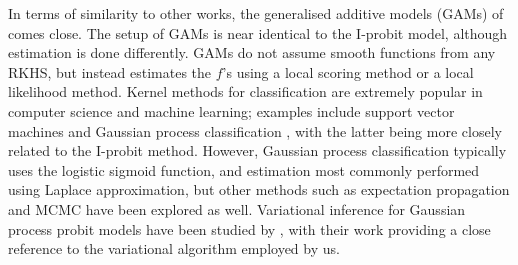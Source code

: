 \documentclass[a4paper,showframe,11pt]{report}
\begin{document}
In terms of similarity to other works, the generalised additive models (GAMs) of \citet{hastie1986} comes close.
The setup of GAMs is near identical to the I-probit model, although estimation is done differently. 
GAMs do not assume smooth functions from any RKHS, but instead estimates the $f$'s using a local scoring method or a local likelihood method.
Kernel methods for classification are extremely popular in computer science and machine learning; examples include support vector machines \citep{scholkopf2002learning} and Gaussian process classification \citep{rasmussen2006gaussian}, with the latter being more closely related to the I-probit method.
However, Gaussian process classification typically uses the logistic sigmoid function, and estimation most commonly performed using Laplace approximation, but other methods such as expectation propagation \citep{minka2001expectation} and MCMC \citep{neal1999} have been explored as well.
Variational inference for Gaussian process probit models have been studied by \citet{girolami2006variational}, with their work providing a close reference to the variational algorithm employed by us.
\end{document}
